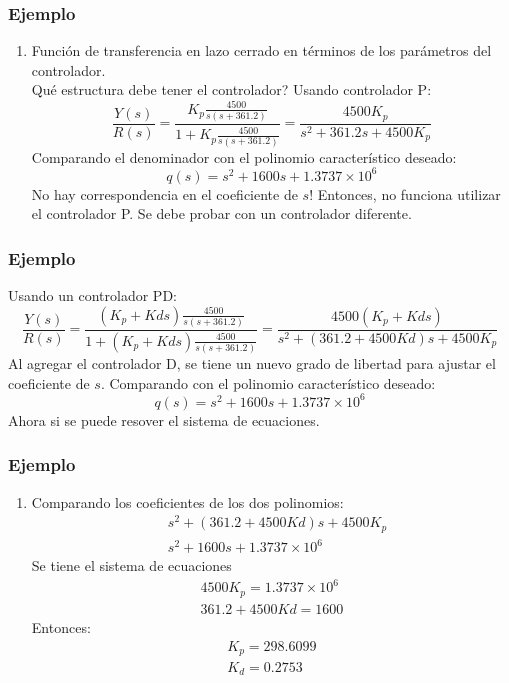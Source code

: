 \documentclass[aspectratio=169]{beamer}
\theoremstyle{definition}
\theoremstyle{plain}
\theoremstyle{remark}
\newcounter{saveenumi}
\newcommand{\seti}{\setcounter{saveenumi}{\value{enumi}}}
\newcommand{\conti}{\setcounter{enumi}{\value{saveenumi}}}
\begin{document}
\begin{frame}[<+->]\frametitle{Ejemplo}
\begin{enumerate}
	\conti
	\item Función de transferencia en lazo cerrado en términos de los parámetros del controlador.\\
	Qué estructura debe tener el controlador? Usando controlador P:
	\begin{equation*}
		\frac{Y(s)}{R(s)} = \frac{K_p\frac{4500}{s(s+361.2)}}{1 + K_p\frac{4500}{s(s+361.2)}} = \frac{4500 K_p}{s^2 + 361.2s + 4500K_p}
	\end{equation*}
	Comparando el denominador con el polinomio característico deseado: 
	\begin{equation*}
		q(s) = s^2 + 1600s +1.3737\times 10^6
	\end{equation*}
	No hay correspondencia en el coeficiente de $s$! Entonces, no funciona utilizar el controlador P. Se debe probar con un controlador diferente.
	\seti
\end{enumerate}	
\end{frame}

\begin{frame}[<+->]\frametitle{Ejemplo}
	Usando un controlador PD:
	\begin{equation*}
		\frac{Y(s)}{R(s)} = \frac{(K_p + Kds)\frac{4500}{s(s+361.2)}}{1 + (K_p + Kds)\frac{4500}{s(s+361.2)}} = \frac{4500 (K_p + Kds)}{s^2 + (361.2+4500Kd)s + 4500K_p}
	\end{equation*}
	Al agregar el controlador D, se tiene un nuevo grado de libertad para ajustar el coeficiente de $s$. Comparando con el polinomio característico deseado:
	\begin{equation*}
		q(s) = s^2 + 1600s + 1.3737\times 10^6
	\end{equation*}
	Ahora si se puede resover el sistema de ecuaciones.
\end{frame}

\begin{frame}[<+->]\frametitle{Ejemplo}
\begin{enumerate}
	\conti
	\item Comparando los coeficientes de los dos polinomios:
	\begin{align*}
		&s^2 + (361.2+4500Kd)s + 4500K_p\\
		&s^2 + 1600s +1.3737\times 10^6
	\end{align*}
	Se tiene el sistema de ecuaciones
	\begin{align*}
		4500K_p = 1.3737\times 10^6\\
		361.2+4500Kd = 1600
	\end{align*}
	Entonces:
	\begin{align*}
		K_p = 298.6099\\
		K_d = 0.2753
	\end{align*}
	\seti
\end{enumerate}
\end{frame}
\end{document}
